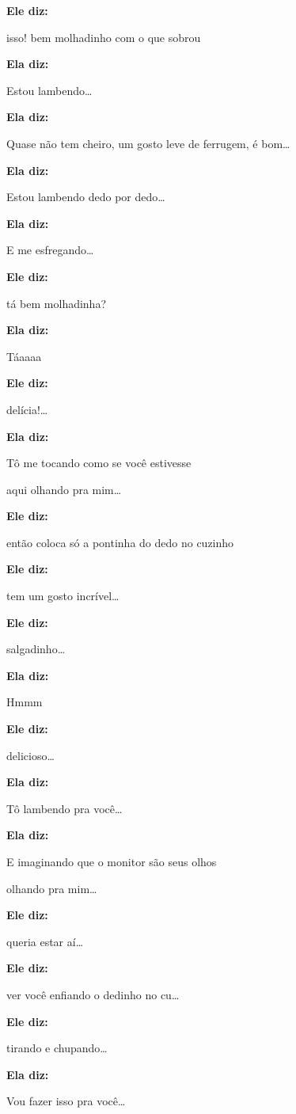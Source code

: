 \textbf{Ele diz:}

isso! bem molhadinho com o que sobrou

\textbf{Ela diz:}

Estou lambendo…

\textbf{Ela diz:}

Quase não tem cheiro, um gosto leve de ferrugem, é bom…

\textbf{Ela diz:}

Estou lambendo dedo por dedo…

\textbf{Ela diz:}

E me esfregando…

\textbf{Ele diz:}

tá bem molhadinha?

\textbf{Ela diz:}

Táaaaa

\textbf{Ele diz:}

delícia!…

\textbf{Ela diz:}

Tô me tocando como se você estivesse

aqui olhando pra mim…

\textbf{Ele diz:}

então coloca só a pontinha do dedo no cuzinho

\textbf{Ele diz:}

tem um gosto incrível…

\textbf{Ele diz:}

salgadinho…

\textbf{Ela diz:}

Hmmm

\textbf{Ele diz:}

delicioso…

\textbf{Ela diz:}

Tô lambendo pra você…

\textbf{Ela diz:}

E imaginando que o monitor são seus olhos

olhando pra mim…

\textbf{Ele diz:}

queria estar aí…

\textbf{Ele diz:}

ver você enfiando o dedinho no cu…

\textbf{Ele diz:}

tirando e chupando…

\textbf{Ela diz:}

Vou fazer isso pra você…

